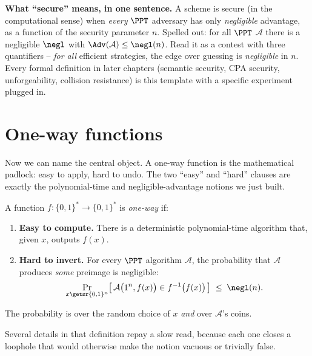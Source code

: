 \begin{focusbox}
\textbf{What ``secure'' means, in one sentence.} A scheme is secure (in the computational sense) when \emph{every} $\PPT$ adversary has only \emph{negligible} advantage, as a function of the security parameter $n$. Spelled out: for all $\PPT$ $\mathcal A$ there is a negligible $\negl$ with $\Adv(\mathcal A) \le \negl(n)$. Read it as a contest with three quantifiers -- \emph{for all} efficient strategies, the edge over guessing is \emph{negligible} in $n$. Every formal definition in later chapters (semantic security, CPA security, unforgeability, collision resistance) is this template with a specific experiment plugged in.
\end{focusbox}

\section{One-way functions}
\label{ch08:owf}

Now we can name the central object. A one-way function is the mathematical padlock: easy to apply, hard to undo. The two ``easy'' and ``hard'' clauses are exactly the polynomial-time and negligible-advantage notions we just built.

\begin{definition}
\label{ch08:def-owf}
A function $f : \{0,1\}^{*} \to \{0,1\}^{*}$ is \emph{one-way} if:
\begin{enumerate}
\item \textbf{Easy to compute.} There is a deterministic polynomial-time algorithm that, given $x$, outputs $f(x)$.
\item \textbf{Hard to invert.} For every $\PPT$ algorithm $\mathcal A$, the probability that $\mathcal A$ produces \emph{some} preimage is negligible:
\[
\Pr_{x \getsr \{0,1\}^{n}}\bigl[\, \mathcal A\bigl(1^{n}, f(x)\bigr) \in f^{-1}\bigl(f(x)\bigr)\,\bigr] \;\le\; \negl(n).
\]
\end{enumerate}
The probability is over the random choice of $x$ \emph{and} over $\mathcal A$'s coins.
\end{definition}

Several details in that definition repay a slow read, because each one closes a loophole that would otherwise make the notion vacuous or trivially false.

